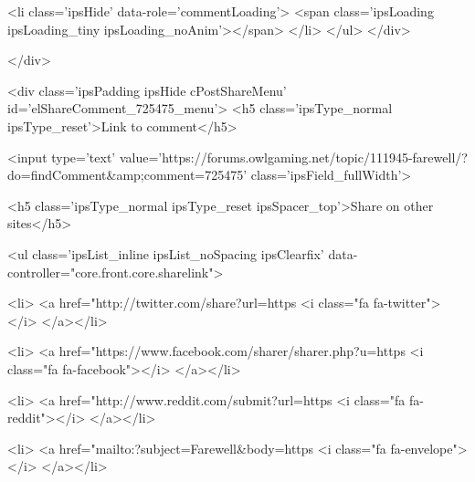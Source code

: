						
						
					
					<li class='ipsHide' data-role='commentLoading'>
						<span class='ipsLoading ipsLoading_tiny ipsLoading_noAnim'></span>
					</li>
				</ul>
			</div>
		

		
			

		
	</div>

	

	



<div class='ipsPadding ipsHide cPostShareMenu' id='elShareComment_725475_menu'>
	<h5 class='ipsType_normal ipsType_reset'>Link to comment</h5>
	
		
	
	
	<input type='text' value='https://forums.owlgaming.net/topic/111945-farewell/?do=findComment&amp;comment=725475' class='ipsField_fullWidth'>

	
	<h5 class='ipsType_normal ipsType_reset ipsSpacer_top'>Share on other sites</h5>
	

	<ul class='ipsList_inline ipsList_noSpacing ipsClearfix' data-controller="core.front.core.sharelink">
		
			<li>
<a href="http://twitter.com/share?url=https%
	<i class="fa fa-twitter"></i>
</a></li>
		
			<li>
<a href="https://www.facebook.com/sharer/sharer.php?u=https%
	<i class="fa fa-facebook"></i>
</a></li>
		
			<li>
<a href="http://www.reddit.com/submit?url=https%
	<i class="fa fa-reddit"></i>
</a></li>
		
			<li>
<a href="mailto:?subject=Farewell&body=https%
	<i class="fa fa-envelope"></i>
</a></li>
		
